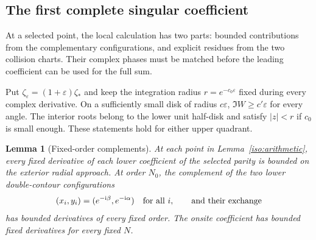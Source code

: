 \documentclass[11pt]{article}
\numberwithin{equation}{section}
\newtheorem{lemma}[theorem]{Lemma}
\theoremstyle{definition}
\newcommand{\ii}{\mathrm i}
\newcommand{\eps}{\varepsilon}
\begin{document}
\subsection{The first complete singular coefficient}

At a selected point, the local calculation has two parts: bounded
contributions from the complementary configurations, and explicit
residues from the two collision charts. Their complex phases must be
matched before the leading coefficient can be used for the full sum.

Put $\zeta_\eps=(1+\eps)\zeta_*$ and keep the integration radius
$r=e^{-c_0\eps}$ fixed during every complex derivative. On a sufficiently
small disk of radius $c\eps$, $\Im W\ge c'\eps$ for every angle.
The interior roots belong to the lower unit half-disk and satisfy
$|z|<r$ if $c_0$ is small enough. These statements hold for either
upper quadrant.

\begin{lemma}[Fixed-order complements]\label{iso:fixed}
At each point in Lemma~\ref{iso:arithmetic}, every fixed derivative of
each lower coefficient of the selected parity is bounded on the exterior
radial approach. At order $N_0$, the complement of the two lower
double-contour configurations
\[
 (x_i,y_i)=(e^{-\ii\beta},e^{-\ii\alpha})\quad\hbox{for all }i,
 \qquad\hbox{and their exchange}
\]
has bounded derivatives of every fixed order. The onsite coefficient has
bounded fixed derivatives for every fixed $N$.
\end{lemma}
\end{document}
